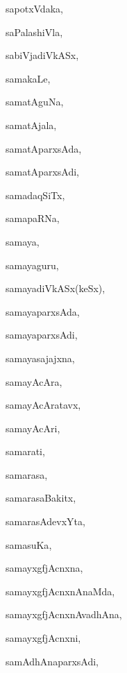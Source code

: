 \begin{multicols}{3}
{\noindent
{sapotxVdaka}, \pageref{sapotxVdaka}

\noindent
{saPalashiVla}, \pageref{saPalashiVla}

\noindent
{sabiVjadiVkASx}, \pageref{sabiVjadiVkASx}

\noindent
{samakaLe}, \pageref{samakaLe}

\noindent
{samatAguNa}, \pageref{samatAguNa}

\noindent
{samatAjala}, \pageref{samatAjala}

\noindent
{samatAparxsAda}, \pageref{samatAparxsAda}

\noindent
{samatAparxsAdi}, \pageref{samatAparxsAdi}

\noindent
{samadaqSiTx}, \pageref{samadaqSiTx}

\noindent
{samapaRNa}, \pageref{samapaRNa}

\noindent
{samaya}, \pageref{samaya}

\noindent
{samayaguru}, \pageref{samayaguru}

\noindent
{samayadiVkASx(keSx)}, \pageref{samayadiVkASxkeSx}

\noindent
{samayaparxsAda}, \pageref{samayaparxsAda}

\noindent
{samayaparxsAdi}, \pageref{samayaparxsAdi}

\noindent
{samayasajajxna}, \pageref{samayasajajxna}

\noindent
{samayAcAra}, \pageref{samayAcAra}

\noindent
{samayAcAratavx}, \pageref{samayAcAratavx}

\noindent
{samayAcAri}, \pageref{samayAcAri}

\noindent
{samarati}, \pageref{samarati}

\noindent
{samarasa}, \pageref{samarasa}

\noindent
{samarasaBakitx}, \pageref{samarasaBakitx}

\noindent
{samarasAdevxYta}, \pageref{samarasAdevxYta}

\noindent
{samasuKa}, \pageref{samasuKa}

\noindent
{samayxgfjAcnxna}, \pageref{samayxgfjAcnxna}

\noindent
{samayxgfjAcnxnAnaMda}, \pageref{samayxgfjAcnxnAnaMda}

\noindent
{samayxgfjAcnxnAvadhAna}, \pageref{samayxgfjAcnxnAvadhAna}

\noindent
{samayxgfjAcnxni}, \pageref{samayxgfjAcnxni}

\noindent
{samAdhAnaparxsAdi}, \pageref{samAdhAnaparxsAdi}

}
\end{multicols}
